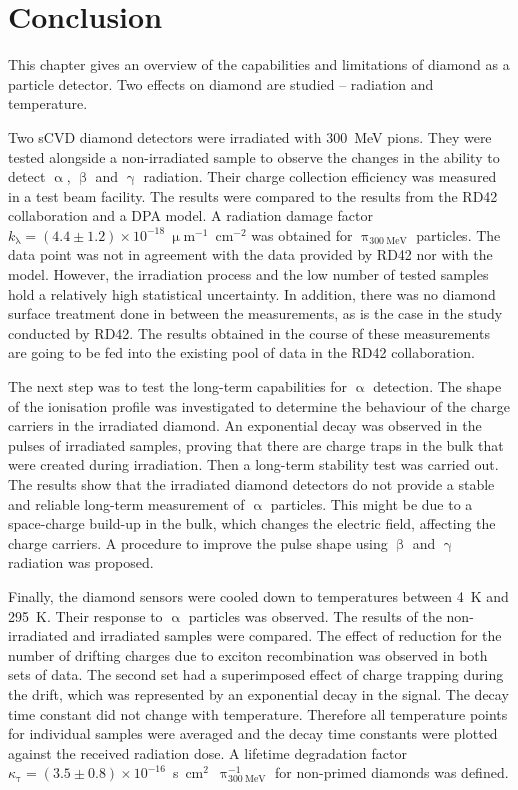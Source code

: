 \section{Conclusion}
\label{sec:radlimit}
This chapter gives an overview of the capabilities and limitations of diamond as a particle detector. Two effects on diamond are studied -- radiation and temperature. 

Two sCVD diamond detectors were irradiated with 300~MeV pions. They were tested alongside a non-irradiated sample to observe the changes in the ability to detect $\upalpha$, $\upbeta$ and $\upgamma$ radiation. Their charge collection efficiency was measured in a test beam facility. The results were compared to the results from the RD42 collaboration and a DPA model. A radiation damage factor $k_{\mathrm{\lambda}}=(4.4\pm1.2)\times10^{-18}~\upmu$m$^{-1}$~cm$^{-2}$ was obtained for $\uppi_{\mathrm{300~MeV}}$ particles. The data point was not in agreement with the data provided by RD42 nor with the model. However, the irradiation process and the low number of tested samples hold a relatively high statistical uncertainty. In addition, there was no diamond surface treatment done in between the measurements, as is the case in the study conducted by RD42. The results obtained in the course of these measurements are going to be fed into the existing pool of data in the RD42 collaboration.

The next step was to test the long-term capabilities for $\upalpha$ detection. The shape of the ionisation profile was investigated to determine the behaviour of the charge carriers in the irradiated diamond. An exponential decay was observed in the pulses of irradiated samples, proving that there are charge traps in the bulk that were created during irradiation. Then a long-term stability test was carried out. The results show that the irradiated diamond detectors do not provide a stable and reliable long-term measurement of $\upalpha$ particles. This might be due to a space-charge build-up in the bulk, which changes the electric field, affecting the charge carriers. A procedure to improve the pulse shape using $\upbeta$ and $\upgamma$ radiation was proposed.

Finally, the diamond sensors were cooled down to temperatures between 4~K and 295~K. Their response to $\upalpha$ particles was observed. The results of the non-irradiated and irradiated samples were compared. The effect of reduction for the number of drifting charges due to exciton recombination was observed in both sets of data. The second set had a superimposed effect of charge trapping during the drift, which was represented by an exponential decay in the signal. The decay time constant did not change with temperature. Therefore all temperature points for individual samples were averaged and the decay time constants were plotted against the received radiation dose. A lifetime degradation factor $\kappa_{\mathrm{\tau}}=(3.5\pm0.8)\times10^{-16}$~s~cm$^2$~$\uppi_{\mathrm{300~MeV}}^{-1}$ for non-primed diamonds was defined.
